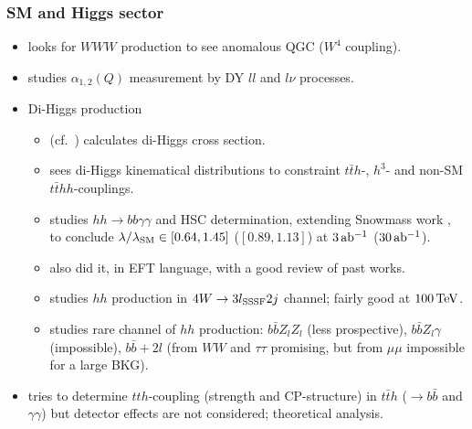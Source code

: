 \documentclass[10pt,a4paper]{article}
\newcommand{\TeV}{\,{\rm TeV}}
\newcommand{\iab}{\,{\rm ab^{-1}}}
\newcommand{\s}[1]{_{\rm #1}}
\begin{document}
\subsubsection{SM and Higgs sector}
\begin{itemize}
 \item \cite{Wen:2014mha} looks for $WWW$ production to see anomalous QGC ($W^4$ coupling).
 \item \cite{Alves:2014cda} studies $\alpha_{1,2}(Q)$ measurement by DY $ll$ and $l\nu$ processes.
 \item Di-Higgs production
\begin{itemize}
 \item \cite{Baglio:2012np} (cf.~\cite{Shao:2013bz}) calculates di-Higgs cross section.
 \item \cite{Chen:2014xra} sees di-Higgs kinematical distributions to constraint $t\bar th$-, $h^3$- and non-SM $t\bar thh$-couplings.
 \item \cite{Barr:2014sga} studies $hh\to bb\gamma\gamma$ and HSC determination, extending Snowmass work \cite{Yao:2013ika}, to conclude $\lambda/\lambda\s{SM} \in [0.64,1.45]$ ($[0.89,1.13]$) at $3\iab$ ($30\iab$).
 \item \cite{Azatov:2015oxa} also did it, in EFT language, with a good review of past works.

 \item \cite{Li:2015yia} studies $hh$ production in $4W\to 3l\s{SSSF}2j$ channel; fairly good at $100\TeV$.

 \item \cite{Papaefstathiou:2015iba} studies rare channel of $hh$ production: $b\bar bZ_lZ_l$ (less prospective), $b\bar bZ_l\gamma$ (impossible), $b\bar b+2l$ (from $WW$ and $\tau\tau$ promising, but from $\mu\mu$ impossible for a large BKG).
\end{itemize}
 \item \cite{He:2014xla} tries to determine $tth$-coupling (strength and CP-structure) in $t\bar t h$ ($\to b\bar b$ and $\gamma\gamma$) but detector effects are not considered; theoretical analysis.
 \end{itemize}
\end{document}

